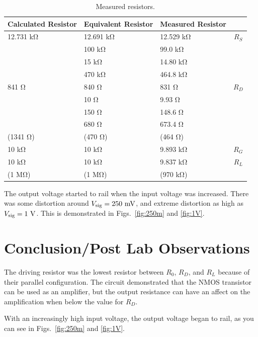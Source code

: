 \documentclass{../../ece-report}
\begin{document}
\begin{table}[h!]
  \centering
  \begin{tabular}{l l l c}\toprule
    \textbf{Calculated Resistor} & \textbf{Equivalent Resistor} & \textbf{Measured Resistor} & \\
    \midrule

12.731 \si{\kohm} & 12.691 \si{\kohm} & 12.529 \si{\kohm} & $R_S$ \\
          & 100 \si{\kohm}    & 99.0 \si{\kohm}   &       \\
          & 15 \si{\kohm}     & 14.80 \si{\kohm}  &       \\
          & 470 \si{\kohm}    & 464.8 \si{\kohm}  &       \\
          \midrule
841 \si{\ohm}    & 840 \si{\ohm}    & 831 \si{\ohm}    & $R_D$ \\
          & 10 \si{\ohm}     & 9.93 \si{\ohm}   &       \\
          & 150 \si{\ohm}    & 148.6 \si{\ohm}  &       \\
          & 680 \si{\ohm}    & 673.4 \si{\ohm}  &       \\
(1341 \si{\ohm})   & (470 \si{\ohm})  & (464 \si{\ohm})  &       \\
          \midrule
10 \si{\kohm}     & 10 \si{\kohm}     & 9.893 \si{\kohm}  & $R_G$ \\
          \midrule
10 \si{\kohm}     & 10 \si{\kohm}     & 9.837 \si{\kohm}  & $R_L$ \\
(1 \si{\Mohm})      & (1 \si{\Mohm})      & (970 \si{\kohm})    &      \\
\bottomrule
\end{tabular}
\caption{Measured resistors.}
\label{tab:resistors}
\end{table}

The output voltage started to rail when the input voltage
was increased. There was some distortion around $V_\textnormal{sig}
= 250~\si{\mV}$, and extreme distortion as high as $V_\textnormal{sig}
= 1~\si{\V}$. This is demonstrated in Figs.~\ref{fig:250m} and \ref{fig:1V}.

\section{Conclusion/Post Lab Observations}

The driving resistor was the lowest resistor between $R_0$, $R_D$, and $R_L$ because 
of their parallel configuration. The circuit demonstrated that the NMOS transistor
can be used as an amplifier, but the output resistance can have an affect on the amplification
when below the value for $R_D$.

With an increasingly high input voltage, the output voltage began to rail, as you can see in Figs.~\ref{fig:250m} and \ref{fig:1V}.
\end{document}
